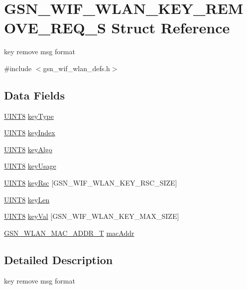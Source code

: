 \hypertarget{a00387}{
\section{GSN\_\-WIF\_\-WLAN\_\-KEY\_\-REMOVE\_\-REQ\_\-S Struct Reference}
\label{a00387}
}


key remove msg format  




{\ttfamily \#include $<$gsn\_\-wif\_\-wlan\_\-defs.h$>$}

\subsection*{Data Fields}
\begin{DoxyCompactItemize}
\item 
\hyperlink{a00660_gab27e9918b538ce9d8ca692479b375b6a}{UINT8} \hyperlink{a00387_aebf6381de07ce9af9d9fa581ce41c05e}{keyType}
\item 
\hyperlink{a00660_gab27e9918b538ce9d8ca692479b375b6a}{UINT8} \hyperlink{a00387_afcf93136bff6ef3037dec249b48d1eba}{keyIndex}
\item 
\hyperlink{a00660_gab27e9918b538ce9d8ca692479b375b6a}{UINT8} \hyperlink{a00387_a53fe92daed71e812f41e8b404d4da106}{keyAlgo}
\item 
\hyperlink{a00660_gab27e9918b538ce9d8ca692479b375b6a}{UINT8} \hyperlink{a00387_ad2cde845408f2d2b0237ffb73e9e5a73}{keyUsage}
\item 
\hyperlink{a00660_gab27e9918b538ce9d8ca692479b375b6a}{UINT8} \hyperlink{a00387_a2eafab72acba3788c4a792fb72c37a34}{keyRsc} \mbox{[}GSN\_\-WIF\_\-WLAN\_\-KEY\_\-RSC\_\-SIZE\mbox{]}
\item 
\hyperlink{a00660_gab27e9918b538ce9d8ca692479b375b6a}{UINT8} \hyperlink{a00387_a19c67de3f96782516f1c496a77e01074}{keyLen}
\item 
\hyperlink{a00660_gab27e9918b538ce9d8ca692479b375b6a}{UINT8} \hyperlink{a00387_a2326484148e2be0bd762aa571f9e5ef6}{keyVal} \mbox{[}GSN\_\-WIF\_\-WLAN\_\-KEY\_\-MAX\_\-SIZE\mbox{]}
\item 
\hyperlink{a00416}{GSN\_\-WLAN\_\-MAC\_\-ADDR\_\-T} \hyperlink{a00387_ab623c15c7dc79be51bcdaa04fba67d90}{macAddr}
\end{DoxyCompactItemize}


\subsection{Detailed Description}
key remove msg format 

